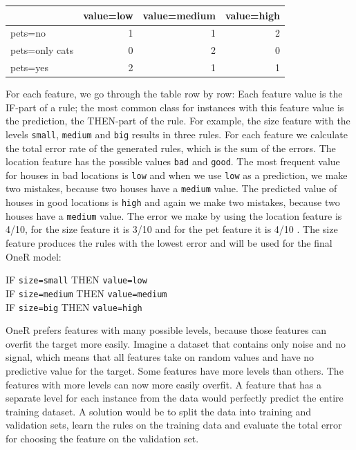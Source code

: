 \documentclass[
  11pt,
]{scrbook}
\begin{document}
\begin{table}
\centering
\begin{tabular}{lrrr}
\toprule
  & value=low & value=medium & value=high\\
\midrule
pets=no & 1 & 1 & 2\\
pets=only cats & 0 & 2 & 0\\
pets=yes & 2 & 1 & 1\\
\bottomrule
\end{tabular}
\end{table}

For each feature, we go through the table row by row:
Each feature value is the IF-part of a rule;
the most common class for instances with this feature value is the prediction, the THEN-part of the rule.
For example, the size feature with the levels \texttt{small}, \texttt{medium} and \texttt{big} results in three rules.
For each feature we calculate the total error rate of the generated rules, which is the sum of the errors.
The location feature has the possible values \texttt{bad} and \texttt{good}.
The most frequent value for houses in bad locations is \texttt{low} and when we use \texttt{low} as a prediction, we make two mistakes, because two houses have a \texttt{medium} value.
The predicted value of houses in good locations is \texttt{high} and again we make two mistakes, because two houses have a \texttt{medium} value.
The error we make by using the location feature is 4/10, for the size feature it is 3/10 and for the pet feature it is 4/10 .
The size feature produces the rules with the lowest error and will be used for the final OneR model:

IF \texttt{size=small} THEN \texttt{value=low}\\
IF \texttt{size=medium} THEN \texttt{value=medium}\\
IF \texttt{size=big} THEN \texttt{value=high}

OneR prefers features with many possible levels, because those features can overfit the target more easily.
Imagine a dataset that contains only noise and no signal, which means that all features take on random values and have no predictive value for the target.
Some features have more levels than others.
The features with more levels can now more easily overfit.
A feature that has a separate level for each instance from the data would perfectly predict the entire training dataset.
A solution would be to split the data into training and validation sets, learn the rules on the training data and evaluate the total error for choosing the feature on the validation set.
\end{document}
